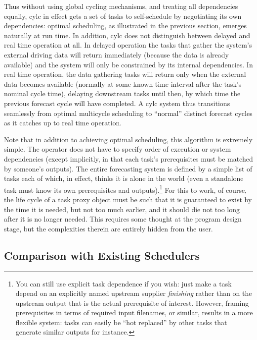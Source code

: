 \documentclass[11pt,a4paper]{article}
\begin{document}
Thus without using global cycling mechanisms, and treating all
dependencies equally, cylc in effect gets a set of tasks to
self-schedule by negotiating its own dependencies: optimal scheduling,
as illustrated in the previous section, emerges naturally at run time.
In addition, cylc does not distinguish between delayed and real time
operation at all. In delayed operation the tasks that gather the
system's external driving data will return immediately (because the data
is already available) and the system will only be constrained by its
internal dependencies. In real time operation, the data gathering tasks
will return only when the external data becomes available (normally at
some known time interval after the task's nominal cycle time), delaying
downstream tasks until then, by which time the previous forecast cycle
will have completed. A cylc system thus transitions seamlessly from
optimal multicycle scheduling to ``normal'' distinct forecast cycles as
it catches up to real time operation.

Note that in addition to achieving optimal scheduling, this algorithm is
extremely simple. The operator does not have to specify order of
execution or system dependencies (except implicitly, in that each task's
prerequisites must be matched by someone's outputs). The entire
forecasting system is defined by a simple list of tasks each of which,
in effect, thinks it is alone in the world (even a standalone task must
know its own prerequisites and outputs).\footnote{You can still use
explicit task dependence if you wish: just make a task depend on an
explicitly named upstream supplier {\em finishing} rather than on the
upstream output that is the actual prerequisite of interest. However,
framing prerequisites in terms of required input filenames, or similar,
results in a more flexible system: tasks can easily be ``hot replaced''
by other tasks that generate similar outputs for instance.}  For this to
work, of course, the life cycle of a task proxy object must be such that
it is guaranteed to exist by the time it is needed, but not too much
earlier, and it should die not too long after it is no longer needed.
This requires some thought at the program design stage, but the
complexities therein are entirely hidden from the user. 

\subsection{Comparison with Existing Schedulers} 
\label{ComparisonwithExistingSchedulers}
\end{document}
